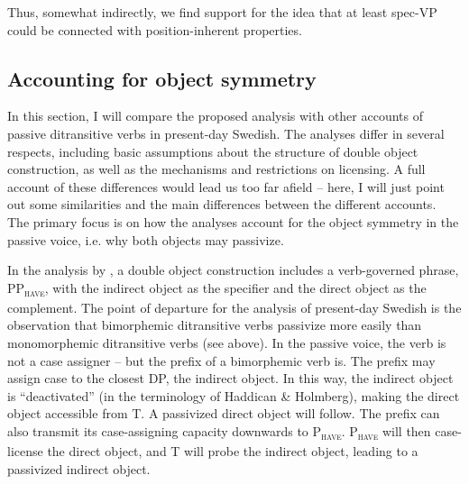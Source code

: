 \documentclass[output=paper]{langscibook}
\begin{document}
\z
\z

Thus, somewhat indirectly, we find support for the idea that at least spec-VP could be connected with position-inherent properties.

\subsection{Accounting for object symmetry}\label{sec:falk:4.5}


In this section, I will compare the proposed analysis with other accounts of passive ditransitive verbs in present-day Swedish. The analyses differ in several respects, including basic assumptions about the structure of double object construction, as well as the mechanisms and restrictions on licensing. A full account of these differences would lead us too far afield – here, I will just point out some similarities and the main differences between the different accounts. The primary focus is on how the analyses account for the object symmetry in the passive voice, i.e. why both objects may passivize.


In the analysis by \citet{HaddicanHolmberg2019}, a double object construction includes a verb-governed phrase, PP\textsc{\textsubscript{have}}, with the indirect object as the specifier and the direct object as the complement. The point of departure for the analysis of present-day Swedish is the observation that bimorphemic ditransitive verbs passivize more easily than monomorphemic ditransitive verbs (see  above). In the passive voice, the verb is not a case assigner – but the prefix of a bimorphemic verb is. The prefix may assign case to the closest DP, the indirect object. In this way, the indirect object is “deactivated” (in the terminology of Haddican \& Holmberg), making the direct object accessible from T. A passivized direct object will follow. The prefix can also transmit its case-assigning capacity downwards to P\textsc{\textsubscript{have}}. P\textsc{\textsubscript{have}} will then case-license the direct object, and T will probe the indirect object, leading to a passivized indirect object.
\end{document}
